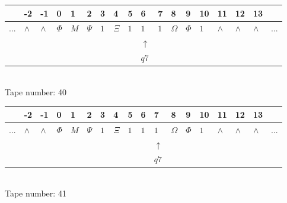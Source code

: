 \documentclass[11pt]{article}
\begin{document}
\begin{table}[H]
\centering
\begin{tabular}{llllllllllllllllll}
 & -2 & -1 & 0 & 1 & 2 & 3 & 4 & 5 & 6 & 7 & 8 & 9 & 10 & 11 & 12 & 13 & \\
\hline
$...$ & \multicolumn{1}{|l|}{$\wedge$} & \multicolumn{1}{|l|}{$\wedge$} & \multicolumn{1}{|l|}{$\Phi$} & \multicolumn{1}{|l|}{$M$} & \multicolumn{1}{|l|}{$\Psi$} & \multicolumn{1}{|l|}{$1$} & \multicolumn{1}{|l|}{$\Xi$} & \multicolumn{1}{|l|}{$1$} & \multicolumn{1}{|l|}{$1$} & \multicolumn{1}{|l|}{$1$} & \multicolumn{1}{|l|}{$\Omega$} & \multicolumn{1}{|l|}{$\Phi$} & \multicolumn{1}{|l|}{$1$} & \multicolumn{1}{|l|}{$\wedge$} & \multicolumn{1}{|l|}{$\wedge$} & \multicolumn{1}{|l|}{$\wedge$} & $...$\\
\hline
&  &  &  &  &  &  &  &  & $\uparrow$ &  &  &  &  &  &  &  &  \\
&  &  &  &  &  &  &  &  & $ q7 $ &  &  &  &  &  &  &  &  \\
\end{tabular}
\\
Tape number: 40
\noindent\makebox[\linewidth]{\hdashrule{\textwidth}{1pt}{1pt}}\end{table}

\begin{table}[H]
\centering
\begin{tabular}{llllllllllllllllll}
 & -2 & -1 & 0 & 1 & 2 & 3 & 4 & 5 & 6 & 7 & 8 & 9 & 10 & 11 & 12 & 13 & \\
\hline
$...$ & \multicolumn{1}{|l|}{$\wedge$} & \multicolumn{1}{|l|}{$\wedge$} & \multicolumn{1}{|l|}{$\Phi$} & \multicolumn{1}{|l|}{$M$} & \multicolumn{1}{|l|}{$\Psi$} & \multicolumn{1}{|l|}{$1$} & \multicolumn{1}{|l|}{$\Xi$} & \multicolumn{1}{|l|}{$1$} & \multicolumn{1}{|l|}{$1$} & \multicolumn{1}{|l|}{$1$} & \multicolumn{1}{|l|}{$\Omega$} & \multicolumn{1}{|l|}{$\Phi$} & \multicolumn{1}{|l|}{$1$} & \multicolumn{1}{|l|}{$\wedge$} & \multicolumn{1}{|l|}{$\wedge$} & \multicolumn{1}{|l|}{$\wedge$} & $...$\\
\hline
&  &  &  &  &  &  &  &  &  & $\uparrow$ &  &  &  &  &  &  &  \\
&  &  &  &  &  &  &  &  &  & $ q7 $ &  &  &  &  &  &  &  \\
\end{tabular}
\\
Tape number: 41
\noindent\makebox[\linewidth]{\hdashrule{\textwidth}{1pt}{1pt}}\end{table}
\clearpage
\end{document}
